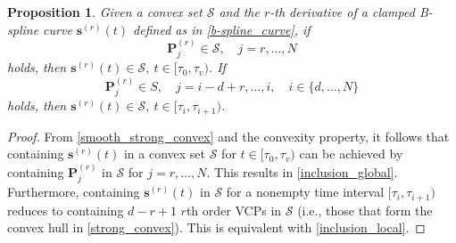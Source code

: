 \documentclass[journal,10pt]{IEEEtran}
\newtheorem{proposition}{\bfseries Proposition}%
\newcommand{\vect}[1]{\boldsymbol{\mathbf{#1}}}
\begin{document}
\begin{proposition} \label{inclusion_prop}
Given a convex set $\mathcal{S}$ and the $r$-th derivative of a clamped B-spline curve $\vect{s}^{(r)}(t)$ defined as in \eqref{b-spline_curve}, if
\begin{equation}
     \vect{P}_{j}^{(r)} \in \mathcal{S}, \quad j=r,\ldots,N
    \label{inclusion_global}
\end{equation}
holds, then $\vect{s}^{(r)}(t) \in \mathcal{S}, \ t\in[\tau_0,\tau_v)$. If
\begin{equation}
    \vect{P}^{(r)}_j \in S, \quad j=i-d+r,\dots,i, \quad i\in\{d,\ldots,N\}
    \label{inclusion_local}
\end{equation}
holds, then $\vect{s}^{(r)}(t)\in \mathcal{S}, \ t\in[\tau_i,\tau_{i+1})$.
\end{proposition}

\begin{proof}
     From \eqref{smooth_strong_convex} and the convexity property, it follows that containing $\vect{s}^{(r)}(t)$ in a convex set $\mathcal{S}$ for $t\in[\tau_0,\tau_v)$ can be achieved by containing $\vect{P}_j^{(r)}$ in $\mathcal{S}$ for $j=r,\ldots,N$. This results in \eqref{inclusion_global}. Furthermore, containing $\vect{s}^{(r)}(t)$ in $\mathcal{S}$ for a nonempty time interval $[\tau_i,\tau_{i+1})$ reduces to containing $d-r+1$ $r$th order VCPs in $\mathcal{S}$ (i.e., those that form the convex hull in \eqref{strong_convex}). This is equivalent with \eqref{inclusion_local}.
\end{proof}
\end{document}
